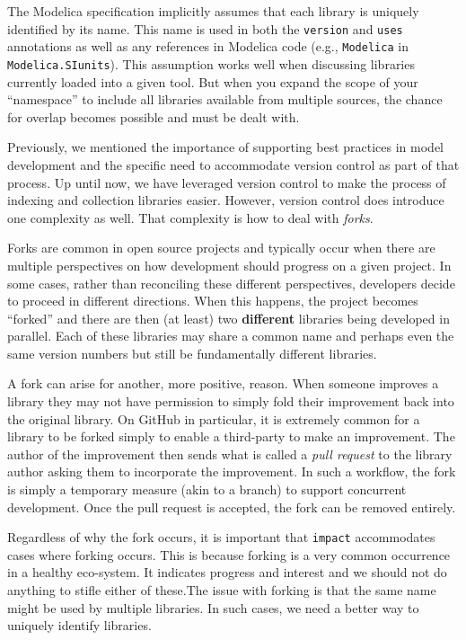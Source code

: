\documentclass[11pt,a4paper,twocolumn]{article}
\newcommand{\code}[1]{\texttt{#1}} %
\begin{document}
The Modelica specification implicitly assumes that each library is
uniquely identified by its name.  This name is used in both the
\code{version} and \code{uses} annotations as well as any references
in Modelica code (e.g., \code{Modelica} in \code{Modelica.SIunits}).
This assumption works well when discussing libraries currently loaded
into a given tool.  But when you expand the scope of your
``namespace'' to include all libraries available from multiple
sources, the chance for overlap becomes possible and must be dealt
with.

Previously, we mentioned the importance of supporting best practices
in model development and the specific need to accommodate version
control as part of that process.  Up until now, we have leveraged
version control to make the process of indexing and collection
libraries easier.  However, version control does introduce one
complexity as well.  That complexity is how to deal with \emph{forks}.

Forks are common in open source projects and typically occur when
there are multiple perspectives on how development should progress on
a given project.  In some cases, rather than reconciling these
different perspectives, developers decide to proceed in different
directions.  When this happens, the project becomes ``forked'' and
there are then (at least) two \textbf{different} libraries being
developed in parallel.  Each of these libraries may share a common
name and perhaps even the same version numbers but still be
fundamentally different libraries.

A fork can arise for another, more positive, reason.  When someone
improves a library they may not have permission to simply fold their
improvement back into the original library.  On GitHub in particular,
it is extremely common for a library to be forked simply to enable a
third-party to make an improvement.  The author of the improvement
then sends what is called a \emph{pull request} to the library author
asking them to incorporate the improvement.  In such a workflow, the
fork is simply a temporary measure (akin to a branch) to support
concurrent development.  Once the pull request is accepted, the fork
can be removed entirely.

Regardless of why the fork occurs, it is important that \code{impact}
accommodates cases where forking occurs.  This is because forking is a
very common occurrence in a healthy eco-system.  It indicates progress
and interest and we should not do anything to stifle either of
these.The issue with forking is that the same name might be used by
multiple libraries.  In such cases, we need a better way to uniquely
identify libraries.
\end{document}
